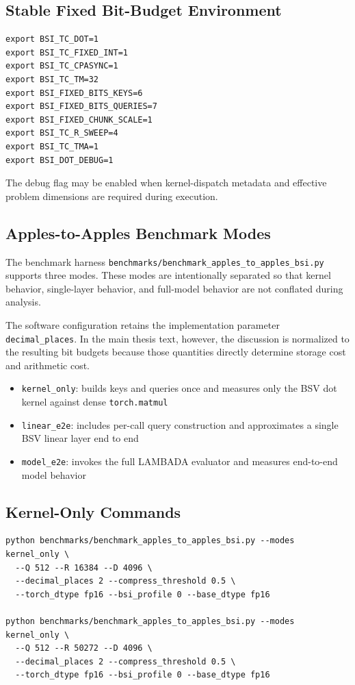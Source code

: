 \subsection{Stable Fixed Bit-Budget Environment}
\begin{lstlisting}
export BSI_TC_DOT=1
export BSI_TC_FIXED_INT=1
export BSI_TC_CPASYNC=1
export BSI_TC_TM=32
export BSI_FIXED_BITS_KEYS=6
export BSI_FIXED_BITS_QUERIES=7
export BSI_FIXED_CHUNK_SCALE=1
export BSI_TC_R_SWEEP=4
export BSI_TC_TMA=1
export BSI_DOT_DEBUG=1
\end{lstlisting}

The debug flag may be enabled when kernel-dispatch metadata and effective problem dimensions are required during execution.

\subsection{Apples-to-Apples Benchmark Modes}
The benchmark harness \texttt{benchmarks/benchmark\_apples\_to\_apples\_bsi.py} supports three modes. These modes are intentionally separated so that kernel behavior, single-layer behavior, and full-model behavior are not conflated during analysis.

The software configuration retains the implementation parameter \texttt{decimal\_places}. In the main thesis text, however, the discussion is normalized to the resulting bit budgets because those quantities directly determine storage cost and arithmetic cost.

\begin{itemize}[leftmargin=2em]
\item \texttt{kernel\_only}: builds keys and queries once and measures only the BSV dot kernel against dense \texttt{torch.matmul}
\item \texttt{linear\_e2e}: includes per-call query construction and approximates a single BSV linear layer end to end
\item \texttt{model\_e2e}: invokes the full LAMBADA evaluator and measures end-to-end model behavior
\end{itemize}

\subsection{Kernel-Only Commands}
\begin{lstlisting}
python benchmarks/benchmark_apples_to_apples_bsi.py --modes kernel_only \
  --Q 512 --R 16384 --D 4096 \
  --decimal_places 2 --compress_threshold 0.5 \
  --torch_dtype fp16 --bsi_profile 0 --base_dtype fp16

python benchmarks/benchmark_apples_to_apples_bsi.py --modes kernel_only \
  --Q 512 --R 50272 --D 4096 \
  --decimal_places 2 --compress_threshold 0.5 \
  --torch_dtype fp16 --bsi_profile 0 --base_dtype fp16
\end{lstlisting}


